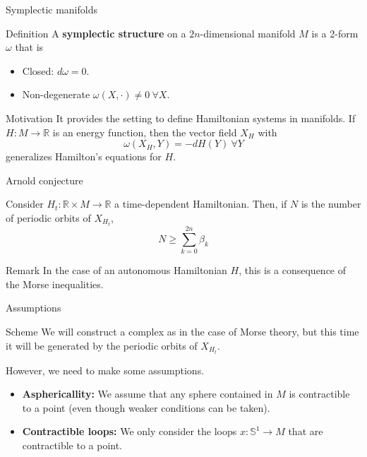\documentclass{beamer}
\newcommand{\con}[1]{\mathbb{#1}}
\newcommand{\R}{\con{R}}
\begin{document}
\begin{frame}{Symplectic manifolds}
	\begin{block}{Definition}
		A {\bf symplectic structure} on a $2n$-dimensional manifold $M$ is a 2-form $\omega$ that is
		\begin{itemize}
			\item Closed: $d\omega = 0$.
			\item Non-degenerate $\omega(X,\cdot) \neq 0 \ \forall X$.
		\end{itemize}
	\end{block}

	\begin{block}{Motivation}
		It provides the setting to define Hamiltonian systems in manifolds. If $H : M \rightarrow \R$ is an energy function, then the vector field $X_H$ with
		\[\omega(X_H,Y) = -dH(Y) \ \forall Y\]
		generalizes Hamilton's equations for $H$.
	\end{block}
\end{frame}

\begin{frame}{Arnold conjecture}
	\begin{theorem}
		Consider $H_t : \R \times M \rightarrow \R$ a time-dependent Hamiltonian. Then, if $N$ is the number of periodic orbits of $X_{H_t}$,
		\[N \geq \sum_{k=0}^{2n} \beta_k\]
	\end{theorem}

	\begin{block}{Remark}
		In the case of an autonomous Hamiltonian $H$, this is a consequence of the Morse inequalities.
	\end{block}
\end{frame}

\begin{frame}{Assumptions}
	\begin{block}{Scheme}
		We will construct a complex as in the case of Morse theory, but this time it will be generated by the periodic orbits of $X_{H_t}$.

		However, we need to make some assumptions.
	\end{block}
	\begin{itemize}
		\item {\bf Asphericallity:} We assume that any sphere contained in $M$ is contractible to a point (even though weaker conditions can be taken).
		\item {\bf Contractible loops:} We only consider the loops $x : \con{S}^1 \rightarrow M$ that are contractible to a point.
	\end{itemize}
\end{frame}
\end{document}
